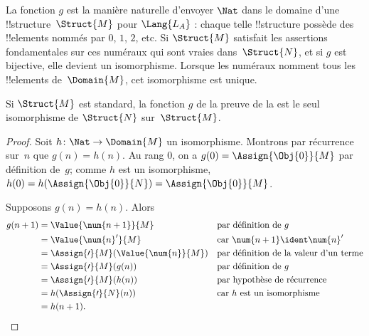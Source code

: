 \documentclass[../../../include/open-logic-section]{subfiles}
\begin{document}
\begin{explain}
La fonction $g$ est la manière naturelle d'envoyer
$\Nat$ dans le domaine d'une !!{structure}~$\Struct{M}$
pour $\Lang{L_A}$ : chaque telle !!{structure} possède
des !!{element}s nommés par $\num{0}$, $\num{1}$,
$\num{2}$, etc. Si $\Struct{M}$ satisfait les
assertions fondamentales sur ces numéraux qui sont
vraies dans~$\Struct{N}$, et si $g$ est bijective,
elle devient un isomorphisme. Lorsque les numéraux
nomment tous les !!{element}s de~$\Domain{M}$,
cet isomorphisme est unique.
\end{explain}

\begin{prop}
Si $\Struct{M}$ est standard, la fonction $g$ de
la preuve de la  est le seul
isomorphisme de $\Struct{N}$ sur~$\Struct{M}$.
\end{prop}

\begin{proof}
Soit $h\colon\Nat\to\Domain{M}$ un isomorphisme.
Montrons par récurrence sur~$n$ que $g(n)=h(n)$.
Au rang $0$, on a
$g(0)=\Assign{\Obj{0}}{M}$ par définition de~$g$;
comme $h$ est un isomorphisme,
$h(0)=h(\Assign{\Obj{0}}{N})
=\Assign{\Obj{0}}{M}$.

Supposons $g(n)=h(n)$. Alors
\begin{align*}
g(n+1)
  &=\Value{\num{n+1}}{M}
     &&\text{par définition de $g$}\\
  &=\Value{\num{n}'}{M}
     &&\text{car $\num{n+1}\ident\num{n}'$}\\
  &=\Assign{\prime}{M}(\Value{\num{n}}{M})
     &&\text{par définition de la valeur d'un terme}\\
  &=\Assign{\prime}{M}(g(n))
     &&\text{par définition de $g$}\\
  &=\Assign{\prime}{M}(h(n))
     &&\text{par hypothèse de récurrence}\\
  &=h(\Assign{\prime}{N}(n))
     &&\text{car $h$ est un isomorphisme}\\
  &=h(n+1).
\end{align*}
\end{proof}
\end{document}
